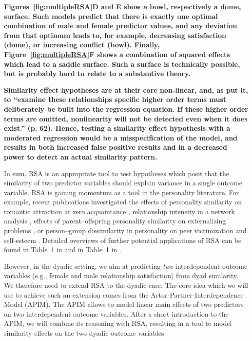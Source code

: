 \documentclass[jou,a4paper,draftfirst]{apa6}
\newcommand{\added}[1]{\textcolor{colour_added}{\bf{#1}}}
\begin{document}
\added{Figures~\ref{fig:multipleRSA}D and E show a bowl, respectively a dome, surface. Such models predict that there is exactly one optimal combination of male and female predictor values, and any deviation from that optimum leads to, for example, decreasing satisfaction (dome), or increasing conflict (bowl).
Finally, Figure~\ref{fig:multipleRSA}F shows a combination of squared effects which lead to a saddle surface. Such a surface is technically possible, but is probably hard to relate to a substantive theory.}



\added{Similarity effect hypotheses are at their core non-linear, and, as \textcite{Aiken_West_1991} put it, to ``examine these relationships specific higher order terms must deliberately be built into the regression equation. If these higher order terms are omitted, nonlinearity will not be detected even when it does exist.'' (p. 62). Hence, testing a similarity effect hypothesis with a moderated regression would be a misspecification of the model, and results in both increased false positive results and in a decreased power to detect an actual similarity pattern.}


In sum, RSA is an appropriate tool to test hypotheses which posit that the similarity of two predictor variables should explain variance in a single outcome variable.
RSA is gaining momentum as a tool in the personality literature. For example, recent publications investigated the effects of personality similarity on romantic attraction at zero acquaintance \parencite{olderbak_predicting_2017}, relationship intensity in a network analysis \parencite{ilmarinen_homophilous_2017}, effects of parent–offspring personality similarity on externalizing problems \parencite{franken_using_2017}, or person–group dissimilarity in personality on peer victimization \parencite{boele_persongroup_2017} and self-esteem \parencite{Bleidorn_2016}. Detailed overviews of further potential applications of RSA can be found in Table~1 in \textcite{Barranti__2017} and in Table~1 in \textcite{HumbergRSA}.

However, in the dyadic setting, we aim at predicting \emph{two} interdependent outcome variables (e.g., female and male relationship satisfaction) from dyad similarity. We therefore need to extend RSA to the dyadic case. The core idea which we will use to achieve such an extension comes from the Actor-Partner-Interdependence Model (APIM). The APIM allows to model linear main effects of two predictors on two interdependent outcome variables. After a short introduction to the APIM, we will combine its reasoning with RSA, resulting in a tool to model similarity effects on the two dyadic outcome variables.
\end{document}
